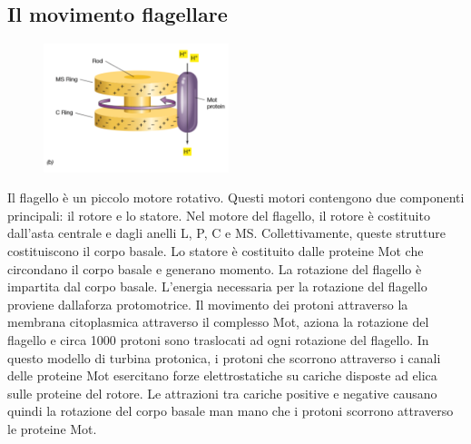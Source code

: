 \subsection{Il movimento flagellare}
\begin{figure}
  \begin{center}
    \includegraphics[width=0.48\textwidth]{Pictures/17.png}
  \end{center}
\end{figure}
Il flagello è un piccolo motore rotativo. Questi motori contengono due componenti principali: il rotore e lo statore. Nel motore del flagello, il rotore è 
costituito dall'asta centrale e dagli anelli L, P, C e MS. Collettivamente, queste strutture costituiscono il corpo basale. Lo statore è costituito dalle 
proteine Mot che circondano il corpo basale e generano momento. La rotazione del flagello è impartita dal corpo basale. L'energia necessaria per la 
rotazione del flagello proviene dallaforza protomotrice. Il movimento dei protoni attraverso la membrana citoplasmica attraverso il complesso Mot, aziona la 
rotazione del flagello e circa 1000 protoni sono traslocati ad ogni rotazione del flagello. In questo modello di turbina protonica, i protoni che scorrono 
attraverso i canali delle proteine Mot esercitano forze elettrostatiche su cariche disposte ad elica sulle proteine del rotore. Le attrazioni tra cariche 
positive e negative causano quindi la rotazione del corpo basale man mano che i protoni scorrono attraverso le proteine Mot.

